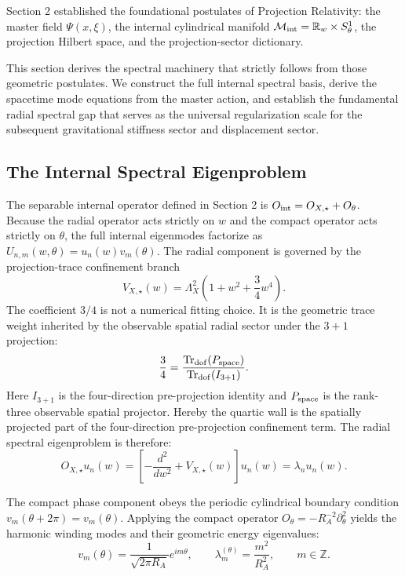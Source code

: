 \documentclass[11pt]{article}
\begin{document}
Section 2 established the foundational postulates of Projection Relativity: the master field $\Psi(x, \xi)$, the internal cylindrical manifold $\mathcal{M}_{\rm int} = \mathbb{R}_w \times S^1_\theta$, the projection Hilbert space, and the projection-sector dictionary. 

This section derives the spectral machinery that strictly follows from those geometric postulates. We construct the full internal spectral basis, derive the spacetime mode equations from the master action, and establish the fundamental radial spectral gap that serves as the universal regularization scale for the subsequent gravitational stiffness sector and displacement sector.

\subsection{The Internal Spectral Eigenproblem}
\label{sec:internal_spectral_eigenproblem}

The separable internal operator defined in Section 2 is \(O_{\rm int}=O_{X,\star}+O_\theta\). Because the radial operator acts strictly on \(w\) and the compact operator acts strictly on \(\theta\), the full internal eigenmodes factorize as \(U_{n,m}(w,\theta)=u_n(w)v_m(\theta)\). The radial component is governed by the projection-trace confinement branch
\begin{equation}
V_{X,\star}(w)
=
\Lambda_X^2
\left(
1+w^2+\frac{3}{4}w^4
\right).
\end{equation}
The coefficient \(3/4\) is not a numerical fitting choice. It is the geometric trace weight inherited by the observable spatial radial sector under the \(3+1\) projection:
\begin{equation}
\frac{3}{4}
=
\frac{
\operatorname{Tr}_{\rm dof}(P_{\rm space})
}{
\operatorname{Tr}_{\rm dof}(I_{3+1})
}.
\end{equation}
Here \(I_{3+1}\) is the four-direction pre-projection identity and \(P_{\rm space}\) is the rank-three observable spatial projector. Hereby the quartic wall is the spatially projected part of the four-direction pre-projection confinement term. The radial spectral eigenproblem is therefore:
\begin{equation}
O_{X,\star}u_n(w)
=
\left[
-\frac{d^2}{dw^2}
+
V_{X,\star}(w)
\right]
u_n(w)
=
\lambda_nu_n(w).
\end{equation}

The compact phase component obeys the periodic cylindrical boundary condition \(v_m(\theta+2\pi)=v_m(\theta)\). Applying the compact operator \(O_\theta=-R_A^{-2}\partial_\theta^2\) yields the harmonic winding modes \cite{Appelquist1987} and their geometric energy eigenvalues:
\begin{equation}
v_m(\theta)
=
\frac{1}{\sqrt{2\pi R_A}}
e^{im\theta},
\qquad
\lambda_m^{(\theta)}
=
\frac{m^2}{R_A^2},
\qquad
m\in\mathbb Z.
\end{equation}
\end{document}
